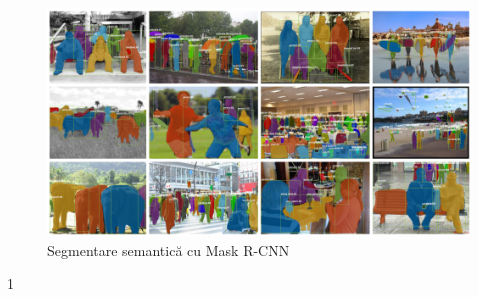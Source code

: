 \begin{figure}[h!]
    	\centering
	\captionsetup{justification=centering, margin=2cm}
	\includegraphics[width=1.0\textwidth]{figures/image_segmentation_results_mrcnn.png}
	\caption{Segmentare semantică cu Mask R-CNN \cite{DBLP:journals/corr/HeGDG17}}
	\label{fig:segmentare_semantica cu Mask R-CNN}
\end{figure}

1             \newline

